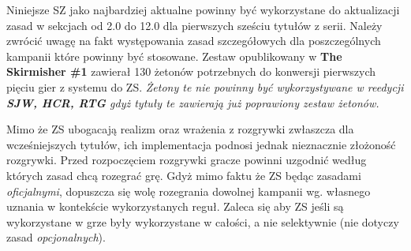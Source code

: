 Niniejsze SZ jako najbardziej aktualne powinny być wykorzystane do aktualizacji zasad w sekcjach od 2.0 do 12.0 dla pierwszych sześciu tytułów z serii. Należy zwrócić uwagę na fakt występowania zasad szczegółowych dla poszczególnych kampanii które powinny być stosowane. Zestaw opublikowany w \textbf{The Skirmisher \#1} zawierał 130 żetonów potrzebnych do konwersji pierwszych pięciu gier z systemu do ZS. \textit{Żetony te nie powinny być wykorzystywane w reedycji \textbf{SJW, HCR, RTG} gdyż tytuły te zawierają już poprawiony zestaw żetonów.}\par
Mimo że ZS ubogacają realizm oraz wrażenia z rozgrywki zwłaszcza dla wcześniejszych tytułów, ich implementacja podnosi jednak nieznacznie złożoność rozgrywki. Przed rozpoczęciem rozgrywki gracze powinni uzgodnić według których zasad chcą rozegrać grę. Gdyż mimo faktu że ZS będąc zasadami \textit{oficjalnymi}, dopuszcza się wolę rozegrania dowolnej kampanii wg. własnego uznania w kontekście wykorzystanych reguł. Zaleca się aby ZS jeśli są wykorzystane w grze były wykorzystane w całości, a nie selektywnie (nie dotyczy zasad \textit{opcjonalnych}).